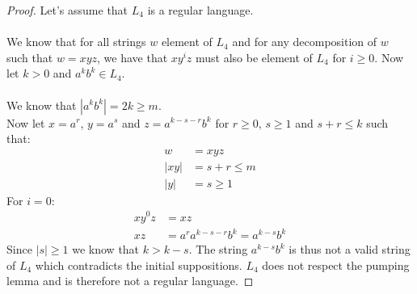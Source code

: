 \begin{enumerate}[label={(\alph*)}]
\begin{proof}
            Let's assume that $L_4$ is a regular language.\\ \\
            We  know that for all strings $w$ element of $L_4$ and for any decomposition of $w$ such that $w = xyz$, we have that $xy^iz$ must also be element of $L_4$ for $i \geq 0$.
            Now let $k > 0$ and $a^kb^k \in L_4$. \\ \\
            We know that $|a^kb^k| = 2k \geq m$. \\
            Now let $x = a^r$, $y = a^s$ and $z = a^{k- s - r}b^k$ for $r \geq 0$, $s \geq 1$ and $s + r \leq k$ such that:
            \begin{align*}
                w &= xyz\\
                |xy| &= s + r \leq m\\ 
                |y| &= s \geq 1
            \end{align*}
            \noindent For $i = 0$:\\
            \begin{align*}
                xy^0z &= xz \\
                xz &= a^ra^{k-s-r}b^k = a^{k - s}b^k
            \end{align*}
            \noindent Since $|s| \geq 1$ we  know that $k > k - s$. The string $a^{k-s}b^k$ is thus not a valid string of $L_4$ which contradicts the initial suppositions. $L_4$ does not respect the pumping lemma and is therefore not a regular language.
        \end{proof}
\end{enumerate}